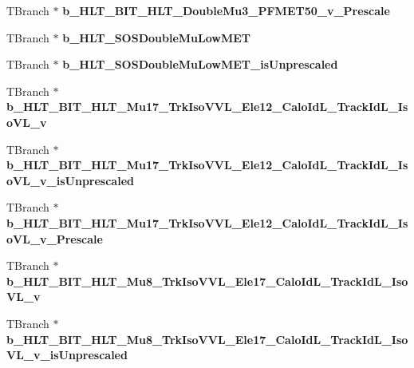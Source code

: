 \begin{DoxyCompactItemize}
\item 
\hypertarget{classMiniTree_a6a0d6fa4008e84dc5162d8c41e0f6b80}{}\label{classMiniTree_a6a0d6fa4008e84dc5162d8c41e0f6b80} 
T\+Branch $\ast$ {\bfseries b\+\_\+\+H\+L\+T\+\_\+\+B\+I\+T\+\_\+\+H\+L\+T\+\_\+\+Double\+Mu3\+\_\+\+P\+F\+M\+E\+T50\+\_\+v\+\_\+\+Prescale}
\item 
\hypertarget{classMiniTree_a71f1ac5f5b6c6221840d5cacf0188f22}{}\label{classMiniTree_a71f1ac5f5b6c6221840d5cacf0188f22} 
T\+Branch $\ast$ {\bfseries b\+\_\+\+H\+L\+T\+\_\+\+S\+O\+S\+Double\+Mu\+Low\+M\+ET}
\item 
\hypertarget{classMiniTree_a24f0cb7d2dc1fb60a3483a1d03fa4b1a}{}\label{classMiniTree_a24f0cb7d2dc1fb60a3483a1d03fa4b1a} 
T\+Branch $\ast$ {\bfseries b\+\_\+\+H\+L\+T\+\_\+\+S\+O\+S\+Double\+Mu\+Low\+M\+E\+T\+\_\+is\+Unprescaled}
\item 
\hypertarget{classMiniTree_ac491158c95d8685c32b0ed7307145833}{}\label{classMiniTree_ac491158c95d8685c32b0ed7307145833} 
T\+Branch $\ast$ {\bfseries b\+\_\+\+H\+L\+T\+\_\+\+B\+I\+T\+\_\+\+H\+L\+T\+\_\+\+Mu17\+\_\+\+Trk\+Iso\+V\+V\+L\+\_\+\+Ele12\+\_\+\+Calo\+Id\+L\+\_\+\+Track\+Id\+L\+\_\+\+Iso\+V\+L\+\_\+v}
\item 
\hypertarget{classMiniTree_a7d6449b1be07effc9b1c2cfe724e39d5}{}\label{classMiniTree_a7d6449b1be07effc9b1c2cfe724e39d5} 
T\+Branch $\ast$ {\bfseries b\+\_\+\+H\+L\+T\+\_\+\+B\+I\+T\+\_\+\+H\+L\+T\+\_\+\+Mu17\+\_\+\+Trk\+Iso\+V\+V\+L\+\_\+\+Ele12\+\_\+\+Calo\+Id\+L\+\_\+\+Track\+Id\+L\+\_\+\+Iso\+V\+L\+\_\+v\+\_\+is\+Unprescaled}
\item 
\hypertarget{classMiniTree_a0f10a952de9531e1f36d03cacb5c6aa1}{}\label{classMiniTree_a0f10a952de9531e1f36d03cacb5c6aa1} 
T\+Branch $\ast$ {\bfseries b\+\_\+\+H\+L\+T\+\_\+\+B\+I\+T\+\_\+\+H\+L\+T\+\_\+\+Mu17\+\_\+\+Trk\+Iso\+V\+V\+L\+\_\+\+Ele12\+\_\+\+Calo\+Id\+L\+\_\+\+Track\+Id\+L\+\_\+\+Iso\+V\+L\+\_\+v\+\_\+\+Prescale}
\item 
\hypertarget{classMiniTree_a7b79a119d654921a45e790b1ebad8a02}{}\label{classMiniTree_a7b79a119d654921a45e790b1ebad8a02} 
T\+Branch $\ast$ {\bfseries b\+\_\+\+H\+L\+T\+\_\+\+B\+I\+T\+\_\+\+H\+L\+T\+\_\+\+Mu8\+\_\+\+Trk\+Iso\+V\+V\+L\+\_\+\+Ele17\+\_\+\+Calo\+Id\+L\+\_\+\+Track\+Id\+L\+\_\+\+Iso\+V\+L\+\_\+v}
\item 
\hypertarget{classMiniTree_a7e485221e45b98b958488a4f7c2d5941}{}\label{classMiniTree_a7e485221e45b98b958488a4f7c2d5941} 
T\+Branch $\ast$ {\bfseries b\+\_\+\+H\+L\+T\+\_\+\+B\+I\+T\+\_\+\+H\+L\+T\+\_\+\+Mu8\+\_\+\+Trk\+Iso\+V\+V\+L\+\_\+\+Ele17\+\_\+\+Calo\+Id\+L\+\_\+\+Track\+Id\+L\+\_\+\+Iso\+V\+L\+\_\+v\+\_\+is\+Unprescaled}

\end{DoxyCompactItemize}

